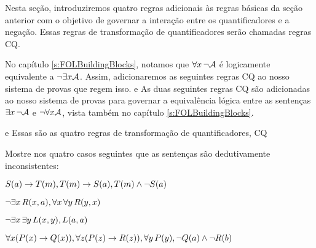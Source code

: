 Nesta se\c c\~ao, introduziremos quatro regras adicionais \`as regras b\'asicas da se\c c\~ao anterior com o objetivo de governar a intera\c c\~ao entre os quantificadores e a nega\c c\~ao. Essas regras de transforma\c c\~ao de quantificadores ser\~ao chamadas regras CQ.
 
No cap\'itulo \ref{s:FOLBuildingBlocks}, notamos que $\forall x\, \neg\mathcal{A}$
   \'e logicamente equivalente a  $\neg\exists x\mathcal{A}$. Assim, adicionaremos as seguintes regras CQ ao nosso sistema de provas que regem isso. 
e
As duas seguintes  regras CQ  s\~ao adicionadas ao nosso sistema de provas para governar a equival\^encia l\'ogica entre as senten\c cas $\exists x\, \neg\mathcal{A}$  e   $\neg\forall x\mathcal{A}$, vista tamb\'em no  cap\'itulo \ref{s:FOLBuildingBlocks}.

 
e
Essas s\~ao  as quatro regras de transforma\c c\~ao de quantificadores,  CQ


\practiceproblems
\problempart
 Mostre nos quatro casos seguintes que as senten\c cas s\~ao dedutivamente inconsistentes:
\begin{earg}
\item $\mathord{S}(a)\rightarrow \mathord{T}(m), \mathord{T}(m) \rightarrow \mathord{S}(a), \mathord{T}(m) \wedge \neg \mathord{S}(a)$
\item $\neg\exists x\,\mathord{R}(x,a), \forall x\, \forall y\,\mathord{R}(y,x)$
\item $\neg\exists x\, \exists y\,\mathord{L}(x,y), \mathord{L}(a,a)$
\item $\forall x(\mathord{P}(x) \rightarrow \mathord{Q}(x)), \forall z(\mathord{P}(z) \rightarrow \mathord{R}(z)), \forall y\,\mathord{P}(y), \neg \mathord{Q}(a) \wedge \neg \mathord{R}(b)$
\end{earg}

